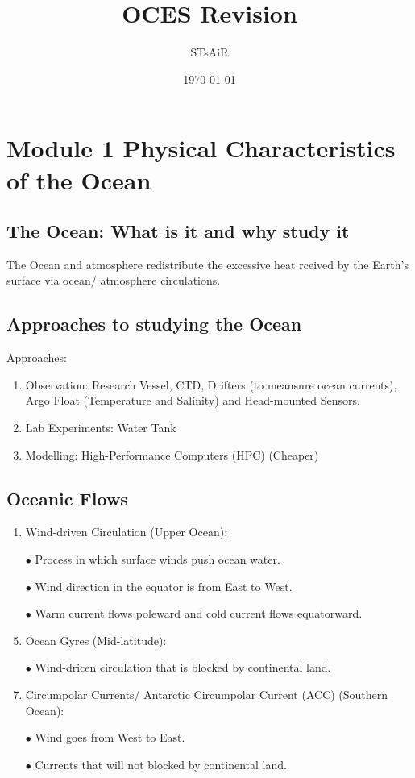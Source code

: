 \documentclass{report}
\title{OCES Revision}
\author{STsAiR}
\date{\today}
\begin{document}
\maketitle
\tableofcontents


\chapter{Module 1 Physical Characteristics of the Ocean}


\section{The Ocean: What is it and why study it}
The Ocean and atmosphere redistribute the excessive heat rceived by the Earth's surface via ocean/ atmosphere circulations.


\section{Approaches to studying the Ocean}
Approaches:
\begin{enumerate}
    \item Observation: Research Vessel, CTD, Drifters (to meansure ocean currents), Argo Float (Temperature and Salinity) and Head-mounted Sensors.
    \item Lab Experiments: Water Tank
    \item Modelling: High-Performance Computers (HPC) (Cheaper)
\end{enumerate}


\section{Oceanic Flows}
\begin{enumerate}
    \item Wind-driven Circulation (Upper Ocean): 
    \item [$\bullet$]Process in which surface winds push ocean water.
    \item [$\bullet$]Wind direction in the equator is from East to West.
    \item [$\bullet$]Warm current flows poleward and cold current flows equatorward.
    \item Ocean Gyres (Mid-latitude): 
    \item [$\bullet$]Wind-dricen circulation that is blocked by continental land.
    \item Circumpolar Currents/ Antarctic Circumpolar Current (ACC) (Southern Ocean):
    \item [$\bullet$]Wind goes from West to East.
    \item [$\bullet$]Currents that will not blocked by continental land.
\end{enumerate}
\end{document}
